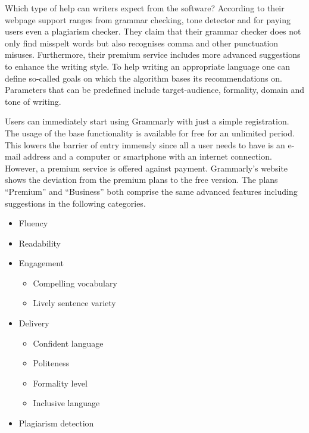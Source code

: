 \documentclass[runningheads]{llncs}
\let\OldTextregistered\textregistered
\renewcommand{\textregistered}{\OldTextregistered\xspace}%
\begin{document}
Which type of help can writers expect from the software? According to their webpage \parencite{noauthor_write_nodate} support ranges from grammar checking, tone detector and for paying users even a plagiarism checker. They claim that their grammar checker does not only find misspelt words but also recognises comma and other punctuation misuses. Furthermore, their premium service includes more advanced suggestions to enhance the writing style. To help writing an appropriate language one can define so-called goals on which the algorithm bases its recommendations on. Parameters that can be predefined include target-audience, formality, domain and tone of writing.   

Users can immediately start using Grammarly\textregistered with just a simple registration. The usage of the base functionality is available for free for an unlimited period. This lowers the barrier of entry immensly since all a user needs to have is an e-mail address and a computer or smartphone with an internet connection. However, a premium service is offered against payment. Grammarly\textregistered's website \citep{noauthor_write_nodate} shows the deviation from the premium plans to the free version. The plans ``Premium'' and ``Business'' both comprise the same advanced features including suggestions in the following categories.
\begin{itemize}
 \item Fluency
 \item Readability
 \item Engagement
 \begin{itemize}
  \item Compelling vocabulary
  \item Lively sentence variety
 \end{itemize}
 \item Delivery
 \begin{itemize}
  \item Confident language
  \item Politeness
  \item Formality level
  \item Inclusive language
 \end{itemize}
 \item Plagiarism detection
\end{itemize}
\end{document}
